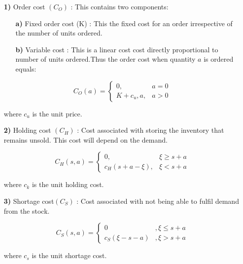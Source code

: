 \documentclass[11pt,a4paper,oneside]{report}
\begin{document}
\begin{enumerate}
\item[\textbf{1)}] Order cost $(C_O)$ : This contains two components:
\begin{enumerate}
\item[\textbf{a)}] Fixed order cost (K) : This the fixed cost for an order irrespective of the number of units ordered.
\item[\textbf{b)}] Variable cost : This is a linear cost cost directly proportional to number of units ordered.Thus the order cost when quantity $a$  is ordered equals:\\
\end{enumerate}
\begin{equation}
C_O(a) = 
\begin{cases}
0 ,            &a=0\\
K+ c_u, {a} ,                &a>0
\end{cases}
\end{equation}

\hspace{6mm} where  $c_u$  is the unit price.

\item[\textbf{2)}]Holding cost $(C_H)$ : Cost associated with storing the inventory that remains unsold. This cost will depend on the demand.

\begin{equation}
C_H(s,a) = 
\begin{cases}
0,   &\xi \geq s+a\\
c_H(s+a-\xi),     & \xi <s+a
\end{cases}
\end{equation}
\begin{flushleft}where $c_k$ is the unit holding cost.
\end{flushleft}

\item[\textbf{3)}]	Shortage cost$(C_S)$ : Cost associated with not being able to fulfil demand from the stock. 

\begin{equation}
C_S(s,a) = 
\begin{cases}
0          &,\xi \leq s+a\\
c_S(\xi-s-a)     &  ,\xi >s+a
\end{cases}
\end{equation}
\begin{flushleft}where $c_s$ is the unit shortage cost.
\end{flushleft}
\end{enumerate}
\end{document}
